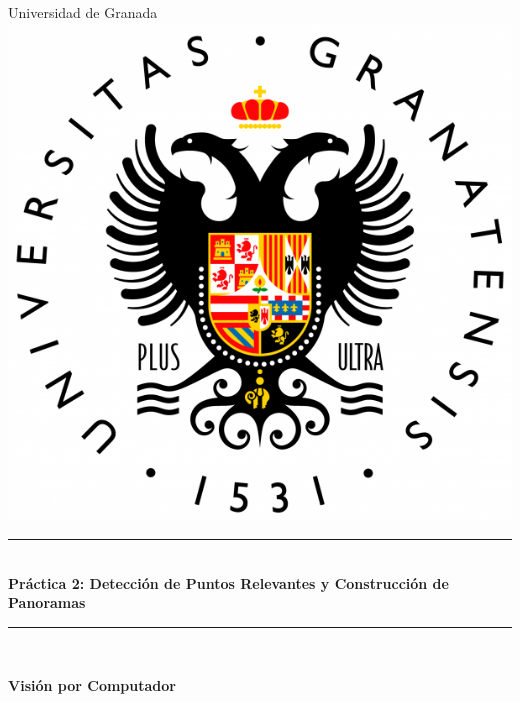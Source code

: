 \documentclass[12pt,spanish]{article} %
\author{Federico Rafael García García}
\begin{document}
\abovedisplayshortskip=0pt
\belowdisplayshortskip=0.0cm
\abovedisplayskip=0.0cm
\belowdisplayskip=0pt



\begin{titlepage}

\newcommand{\HRule}{\rule{\linewidth}{0.5mm}} %

\center %

\LARGE Universidad de Granada\\[1cm] %

\includegraphics[scale=.2]{logo}

\HRule \\[0.5cm]
{ \LARGE \bfseries Práctica 2: Detección de Puntos Relevantes y Construcción de Panoramas}\\[0.1cm] %
\HRule \\[0.5cm]

\vspace{1.0cm}

\Large \textbf{Visión por Computador}


\end{titlepage}
\end{document}
